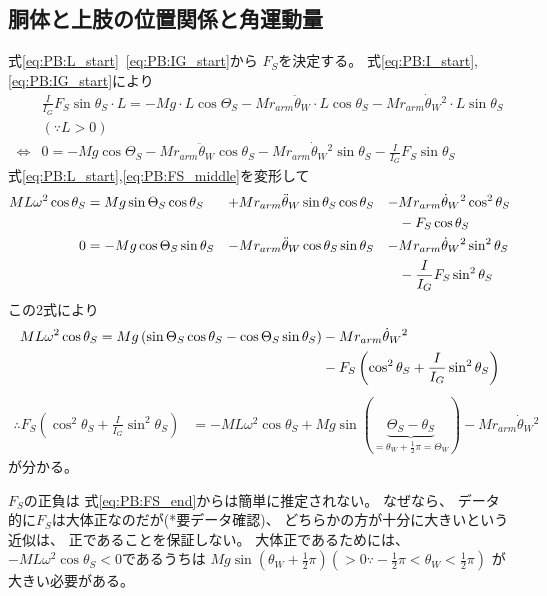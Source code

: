 \documentclass[a4paper,11pt]{jsarticle}
\begin{document}
\subsection{胴体と上肢の位置関係と角運動量}
式\ref{eq:PB:L_start}~\ref{eq:PB:IG_start}から
$F_S$を決定する。
式\ref{eq:PB:I_start},\ref{eq:PB:IG_start}により
\begin{align}
  & \frac{I}{I_G}F_S\sin\theta_S \cdot L 
  = -Mg \cdot L\cos\Theta_S
  - Mr_{arm}\ddot{\theta}_W \cdot L \cos\theta_S
  - Mr_{arm}\dot{\theta}_W{}^2 \cdot L \sin\theta_S
  \\
  & \left( \because L > 0 \right)
  \\
  \Leftrightarrow
  & 0
  = -Mg \cos\Theta_S
  - Mr_{arm}\ddot{\theta}_W \cos\theta_S
  - Mr_{arm}\dot{\theta}_W{}^2 \sin\theta_S
  - \frac{I}{I_G}F_S\sin\theta_S
  \label{eq:PB:FS_middle}
\end{align}
式\ref{eq:PB:L_start},\ref{eq:PB:FS_middle}を変形して
\begin{align}
  ML\omega^2 \cos\theta_S
  &= Mg\sin\Theta_S \cos\theta_S
  &+& Mr_{arm}\ddot{\theta}_W\sin\theta_S  \cos\theta_S
  &-& Mr_{arm}\dot{\theta}_W{}^2\cos^2\theta_S 
  \notag
  \\
  &&&&& - F_S\cos\theta_S
  \\
  0 
  &= -Mg \cos\Theta_S \sin\theta_S
  &-& Mr_{arm}\ddot{\theta}_W \cos\theta_S \sin\theta_S
  &-& Mr_{arm}\dot{\theta}_W{}^2 \sin^2\theta_S
  \notag
  \\
  &&&&& - \frac{I}{I_G}F_S\sin^2\theta_S
\end{align}
この2式により
\begin{align}
  ML\omega^2 \cos\theta_S 
  = Mg\left( \sin\Theta_S \cos\theta_S - \cos\Theta_S \sin\theta_S\right)
  &- Mr_{arm}\dot{\theta}_W{}^2
  \notag
  \\
  &- F_S\left( \cos^2\theta_S + \frac{I}{I_G}\sin^2\theta_S \right)
\end{align}
\begin{align}
  \therefore
  F_S\left( \cos^2\theta_S + \frac{I}{I_G}\sin^2\theta_S \right)
  &= -ML\omega^2 \cos\theta_S 
  + Mg \sin(\underbrace{\Theta_S - \theta_S}_{=\theta_W+\frac{1}{2}\pi=\Theta_W})
  - Mr_{arm}\dot{\theta}_W{}^2
  \label{eq:PB:FS_end}
\end{align}
が分かる。

$F_S$の正負は
式\ref{eq:PB:FS_end}からは簡単に推定されない。
なぜなら、
データ的に$F_S$は大体正なのだが(*要データ確認)、
どちらかの方が十分に大きいという近似は、
正であることを保証しない。
大体正であるためには、
$-ML\omega^2\cos\theta_S < 0$であるうちは
$Mg\sin(\theta_W + \frac{1}{2}\pi) ( > 0 \because -\frac{1}{2}\pi < \theta_W < \frac{1}{2}\pi )$
が大きい必要がある。
\end{document}
